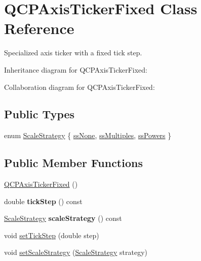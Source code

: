 \hypertarget{classQCPAxisTickerFixed}{}\section{Q\+C\+P\+Axis\+Ticker\+Fixed Class Reference}
\label{classQCPAxisTickerFixed}


Specialized axis ticker with a fixed tick step.  




Inheritance diagram for Q\+C\+P\+Axis\+Ticker\+Fixed\+:


Collaboration diagram for Q\+C\+P\+Axis\+Ticker\+Fixed\+:
\subsection*{Public Types}
\begin{DoxyCompactItemize}
\item 
enum \hyperlink{classQCPAxisTickerFixed_a15b3d38b935d404b1311eb85cfb6a439}{Scale\+Strategy} \{ \hyperlink{classQCPAxisTickerFixed_a15b3d38b935d404b1311eb85cfb6a439a6621275677a05caa0de204ae3956b85f}{ss\+None}, 
\hyperlink{classQCPAxisTickerFixed_a15b3d38b935d404b1311eb85cfb6a439a22f651785f6412645837421896561104}{ss\+Multiples}, 
\hyperlink{classQCPAxisTickerFixed_a15b3d38b935d404b1311eb85cfb6a439ac39d5813e9165ebd494307ae61ce5dce}{ss\+Powers}
 \}
\end{DoxyCompactItemize}
\subsection*{Public Member Functions}
\begin{DoxyCompactItemize}
\item 
\hyperlink{classQCPAxisTickerFixed_a96d2b053a15f9b8e94550c3efeff6a34}{Q\+C\+P\+Axis\+Ticker\+Fixed} ()
\item 
\mbox{\label{classQCPAxisTickerFixed_a33d1324c8666b4d5df975dea32ed5a28}} 
double {\bfseries tick\+Step} () const
\item 
\mbox{\label{classQCPAxisTickerFixed_a20fd8fcb257f63449f8913335ad57e45}} 
\hyperlink{classQCPAxisTickerFixed_a15b3d38b935d404b1311eb85cfb6a439}{Scale\+Strategy} {\bfseries scale\+Strategy} () const
\item 
void \hyperlink{classQCPAxisTickerFixed_a4bc83d85a4f81d4abdd3fa5042d7b833}{set\+Tick\+Step} (double step)
\item 
void \hyperlink{classQCPAxisTickerFixed_acbc7c9bcd80b3dc3edee5f0519d301f6}{set\+Scale\+Strategy} (\hyperlink{classQCPAxisTickerFixed_a15b3d38b935d404b1311eb85cfb6a439}{Scale\+Strategy} strategy)
\end{DoxyCompactItemize}
